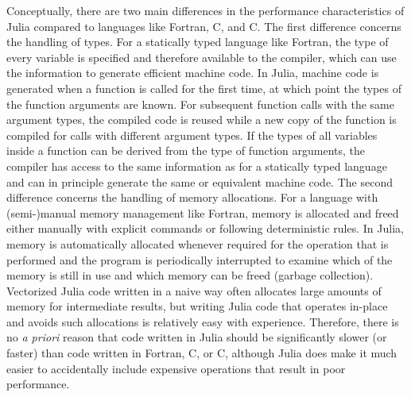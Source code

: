 \documentclass[gmd, manuscript]{copernicus}
\begin{document}
Conceptually, there are two main differences in the performance characteristics of Julia compared to languages like Fortran, C, and C\hspace{-.02ex}\raisebox{.3ex}{\textbf{\scriptsize ++}}.
The first difference concerns the handling of types.
For a statically typed language like Fortran, the type of every variable is specified and therefore available to the compiler, which can use the information to generate efficient machine code.
In Julia, machine code is generated when a function is called for the first time, at which point the types of the function arguments are known.
For subsequent function calls with the same argument types, the compiled code is reused while a new copy of the function is compiled for calls with different argument types.
If the types of all variables inside a function can be derived from the type of function arguments, the compiler has access to the same information as for a statically typed language and can in principle generate the same or equivalent machine code.
The second difference concerns the handling of memory allocations.
For a language with (semi-)manual memory management like Fortran, memory is allocated and freed either manually with explicit commands or following deterministic rules.
In Julia, memory is automatically allocated whenever required for the operation that is performed and the program is periodically interrupted to examine which of the memory is still in use and which memory can be freed (garbage collection).
Vectorized Julia code written in a naive way often allocates large amounts of memory for intermediate results, but writing Julia code that operates in-place and avoids such allocations is relatively easy with experience.
Therefore, there is no \emph{a priori} reason that code written in Julia should be significantly slower (or faster) than code written in Fortran, C, or C\hspace{-.02ex}\raisebox{.3ex}{\textbf{\scriptsize ++}}, although Julia does make it much easier to accidentally include expensive operations that result in poor performance.
\end{document}
